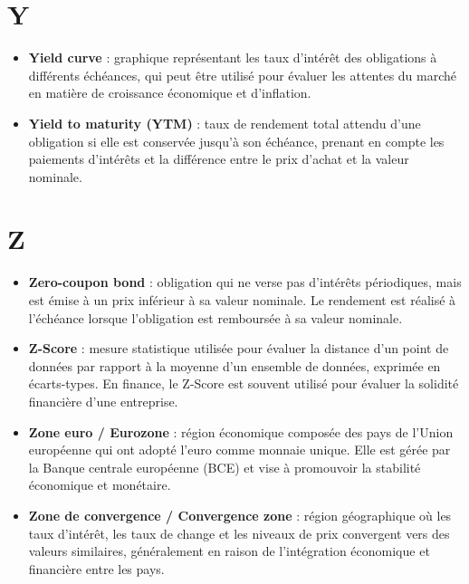 \documentclass[a4paper,10pt]{article}
\begin{document}
\begin{multicols}{2}
\section*{Y}
\begin{itemize}
  \item \textbf{Yield curve} : graphique représentant les taux d’intérêt des obligations à différents échéances, qui peut être utilisé pour évaluer les attentes du marché en matière de croissance économique et d’inflation.
  \item \textbf{Yield to maturity (YTM)} : taux de rendement total attendu d’une obligation si elle est conservée jusqu’à son échéance, prenant en compte les paiements d’intérêts et la différence entre le prix d’achat et la valeur nominale.
\end{itemize}

\section*{Z}
\begin{itemize}
  \item \textbf{Zero-coupon bond} : obligation qui ne verse pas d’intérêts périodiques, mais est émise à un prix inférieur à sa valeur nominale. Le rendement est réalisé à l’échéance lorsque l’obligation est remboursée à sa valeur nominale.
  \item \textbf{Z-Score} : mesure statistique utilisée pour évaluer la distance d’un point de données par rapport à la moyenne d’un ensemble de données, exprimée en écarts-types. En finance, le Z-Score est souvent utilisé pour évaluer la solidité financière d’une entreprise.
  \item \textbf{Zone euro / Eurozone} : région économique composée des pays de l’Union européenne qui ont adopté l’euro comme monnaie unique. Elle est gérée par la Banque centrale européenne (BCE) et vise à promouvoir la stabilité économique et monétaire.
  \item \textbf{Zone de convergence / Convergence zone} : région géographique où les taux d’intérêt, les taux de change et les niveaux de prix convergent vers des valeurs similaires, généralement en raison de l’intégration économique et financière entre les pays.
\end{itemize}

\end{multicols}
\end{document}
